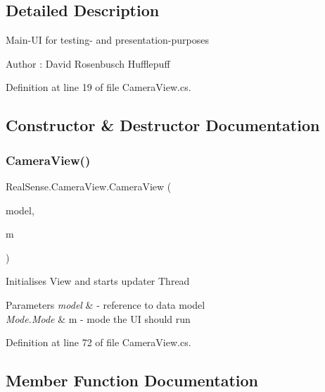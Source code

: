 \subsection{Detailed Description}
Main-\/\+UI for testing-\/ and presentation-\/purposes \begin{DoxyAuthor}{Author}
\+: David Rosenbusch  Hufflepuff 
\end{DoxyAuthor}


Definition at line 19 of file Camera\+View.\+cs.



\subsection{Constructor \& Destructor Documentation}
\mbox{\label{class_real_sense_1_1_camera_view_ac7f93adbed37d386412a051e6f93f978}} 
\subsubsection{\texorpdfstring{Camera\+View()}{CameraView()}}
{\footnotesize\ttfamily Real\+Sense.\+Camera\+View.\+Camera\+View (\begin{DoxyParamCaption}\item[{\hyperlink{class_real_sense_1_1_model}{Model}}]{model,  }\item[{\hyperlink{class_real_sense_1_1_model_ace9541c050b75cb23582ce01ac892190}{Model.\+M\+O\+DE}}]{m }\end{DoxyParamCaption})}

Initialises View and starts updater Thread 
\begin{DoxyParams}{Parameters}
{\em model} & -\/ reference to data model \\
\hline
{\em Mode.\+Mode} & m -\/ mode the UI should run \\
\hline
\end{DoxyParams}


Definition at line 72 of file Camera\+View.\+cs.



\subsection{Member Function Documentation}
\mbox{\label{class_real_sense_1_1_camera_view_a67c8ee2cdbf0caf43e48043d90c0d549}} 
